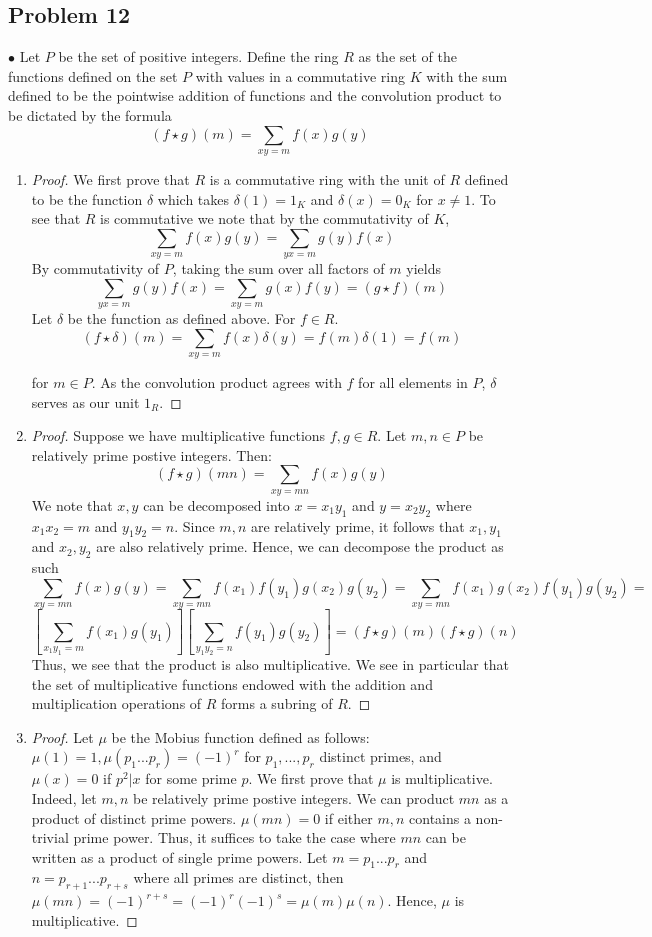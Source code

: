\documentclass[Lang.tex]{subfiles}
\begin{document}
\subsection*{Problem 12}			
 $\bullet$  Let $P$ be the set of positive integers. Define the ring $R$ as the set of the functions defined on the set $P$ with values in a commutative ring $K$ with the sum defined to be the pointwise addition of functions and the convolution product to be dictated by the formula
 $$ (f \star g)(m)  = \sum_{xy = m} f(x)g(y) $$ 
\begin{enumerate}
	\item 
	\begin{proof}
		We first prove that $R$ is a commutative ring with the unit of $R$ defined to be the function $\delta$ which takes $\delta(1) = 1_K$ and $\delta(x) = 0_K$ for $x \neq 1$. To see that $R$ is commutative we note that by the commutativity of $K$, $$ \sum_{xy = m}f(x)g(y) = \sum_{yx = m} g(y)f(x) $$ By commutativity of $P$, taking the sum over all factors of $m$ yields  $$\sum_{yx = m} g(y)f(x) = \sum_{xy = m} g(x)f(y) = (g\star f)(m)$$ Let $\delta$ be the function as defined above. For $f \in R$.
		$$ (f \star \delta)(m) = \sum_{xy = m} f(x)\delta(y) =  f(m)\delta(1)  = f(m) $$ 
		
		for $m \in P$. As the convolution product agrees with $f$ for all elements in $P$, $\delta$ serves as our unit $1_R$.
	\end{proof}
	\item 
		\begin{proof}
			Suppose we have multiplicative functions $f,g \in R$. Let $m,n \in P$ be relatively prime postive integers. Then:
			$$ (f \star g)(mn) = \sum_{xy = mn} f(x)g(y) $$ We note that $x,y$ can be decomposed into $x = x_1y_1$ and $y = x_2y_2$ where $x_1x_2  = m$ and $y_1y_2 = n$. Since $m,n$ are relatively prime, it follows that $x_1,y_1$ and $x_2,y_2$ are also relatively prime. Hence, we can decompose the product as such
			$$ \sum_{xy = mn} f(x)g(y) = \sum_{xy = mn} f(x_1)f(y_1)g(x_2)g(y_2) = \sum_{xy = mn} f(x_1)g(x_2)f(y_1)g(y_2) =$$
			$$ [\sum_{x_1y_1 = m} f(x_1)g(y_1)][\sum_{y_1y_2 = n} f(y_1)g(y_2)] = (f \star g)(m)(f \star g)(n)$$ Thus, we see that the product is also multiplicative. We see in particular that the set of multiplicative functions endowed with the addition and multiplication operations of $R$ forms a subring of $R$.
		\end{proof}
	\item
		\begin{proof}
			Let $\mu$ be the Mobius function defined as follows: $\mu(1) = 1,  \mu(p_1...p_r) = (-1)^r$ for $p_1,...,p_r$ distinct primes, and $\mu(x) = 0$ if $p^2 | x$ for some prime $p$. We first prove that $\mu$ is multiplicative. Indeed, let $m,n$ be relatively prime postive integers. We can product $mn$ as a product of distinct prime powers. $\mu(mn) = 0$ if either $m,n$ contains a non-trivial prime power. Thus, it suffices to take the case where $mn$ can be written as a product of single prime powers. Let $m = p_1...p_r$ and $n = p_{r+1}...p_{r+s}$ where all primes are distinct, then $\mu(mn) = (-1)^{r+s} = (-1)^r(-1)^s = \mu(m)\mu(n)$. Hence, $\mu$ is multiplicative. 
			

\end{proof}
\end{enumerate}
\end{document}
